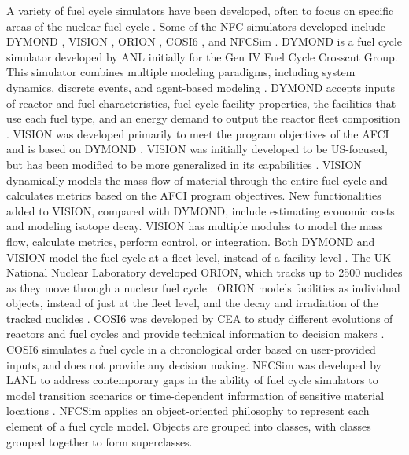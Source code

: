 A variety of fuel cycle simulators have been developed, often to focus on 
specific areas of the nuclear fuel cycle \cite{huff_next_2010}. Some of the 
\gls{NFC} simulators developed include
\gls{DYMOND} \cite{feng_sensitivity_2020,feng_standardized_2016}, 
\gls{VISION} \cite{yacout_visionverifiable_2006}, ORION 
\cite{gregg_analysis_2012}, COSI6 \cite{coquelet-pascal_cosi6:_2015}, and
\gls{NFCSim} \cite{schneider_nfcsim:_2005}.
\gls{DYMOND} is a fuel cycle simulator developed by \gls{ANL} initially for 
the Gen IV Fuel Cycle Crosscut Group. This simulator combines 
multiple modeling paradigms, including system dynamics, discrete events, and
agent-based modeling \cite{feng_standardized_2016,feng_sensitivity_2020}.
\gls{DYMOND} accepts inputs of reactor and fuel characteristics, fuel cycle 
facility properties, the facilities that use each fuel type, and an 
energy demand to output the reactor fleet composition \cite{feng_standardized_2016}.
\gls{VISION} was developed primarily to meet the program objectives of the 
\gls{AFCI} and is based on \gls{DYMOND} \cite{yacout_visionverifiable_2006}.
\gls{VISION} was initially developed to be US-focused, but has been modified to 
be more generalized in its capabilities \cite{feng_standardized_2016}.
\gls{VISION} dynamically models the mass flow of material through the 
entire fuel cycle and calculates metrics based on the \gls{AFCI} program 
objectives. New functionalities added to \gls{VISION}, compared with \gls{DYMOND}, 
include estimating economic costs and modeling isotope decay. 
\gls{VISION} has multiple 
modules to model the mass flow, calculate metrics, perform control, or 
integration. 
Both \gls{DYMOND} and \gls{VISION} model the fuel cycle at a fleet level, 
instead of a facility level \cite{feng_standardized_2016}.  
The UK National Nuclear Laboratory developed ORION, which tracks up to 
2500 nuclides as they 
move through a nuclear fuel cycle \cite{gregg_analysis_2012}. ORION models
facilities as individual objects, instead of just at the fleet level, and 
the decay and irradiation of the tracked nuclides 
\cite{feng_standardized_2016}. COSI6 was developed by \gls{CEA} to 
study different evolutions of reactors and fuel cycles and 
provide technical information to decision makers \cite{coquelet-pascal_cosi6:_2015}. 
COSI6 simulates a fuel 
cycle in a chronological order based on user-provided inputs, and does 
not provide any decision making. \gls{NFCSim} was developed by \gls{LANL}
to address contemporary gaps in the ability of fuel cycle simulators 
to model transition scenarios or time-dependent information of 
sensitive material locations \cite{schneider_nfcsim:_2005}. 
\gls{NFCSim} applies an object-oriented 
philosophy to represent each element of a fuel cycle model. Objects 
are grouped into classes, with classes grouped together to form 
superclasses. 

